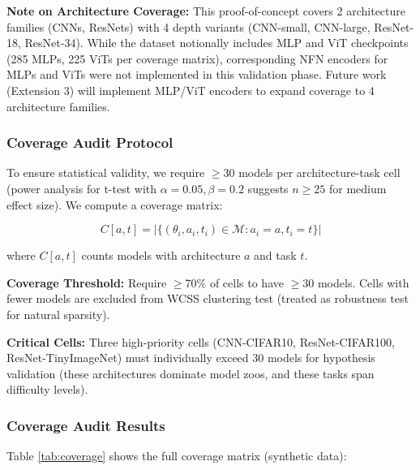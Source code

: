 \textbf{Note on Architecture Coverage:} This proof-of-concept covers 2 architecture families (CNNs, ResNets) with 4 depth variants (CNN-small, CNN-large, ResNet-18, ResNet-34). While the dataset notionally includes MLP and ViT checkpoints (285 MLPs, 225 ViTs per coverage matrix), corresponding NFN encoders for MLPs and ViTs were not implemented in this validation phase. Future work (Extension 3) will implement MLP/ViT encoders to expand coverage to 4 architecture families.

\subsubsection{Coverage Audit Protocol}

To ensure statistical validity, we require $\geq$30 models per architecture-task cell (power analysis for t-test with $\alpha=0.05, \beta=0.2$ suggests $n \geq 25$ for medium effect size). We compute a coverage matrix:

\begin{equation}
C[a, t] = |\{ (\theta_i, a_i, t_i) \in \mathcal{M} : a_i = a, t_i = t \}|
\end{equation}

where $C[a,t]$ counts models with architecture $a$ and task $t$.

\textbf{Coverage Threshold:} Require $\geq$70\% of cells to have $\geq$30 models. Cells with fewer models are excluded from WCSS clustering test (treated as robustness test for natural sparsity).

\textbf{Critical Cells:} Three high-priority cells (CNN-CIFAR10, ResNet-CIFAR100, ResNet-TinyImageNet) must individually exceed 30 models for hypothesis validation (these architectures dominate model zoos, and these tasks span difficulty levels).

\subsubsection{Coverage Audit Results}

Table \ref{tab:coverage} shows the full coverage matrix (synthetic data):

